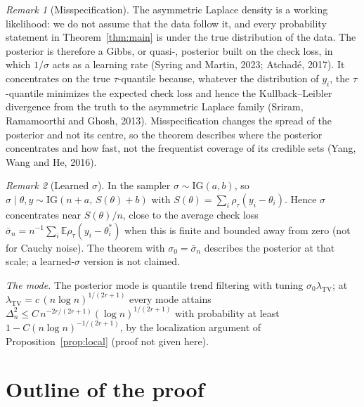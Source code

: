 \documentclass[11pt]{article}
\theoremstyle{definition}
\theoremstyle{remark}
\newtheorem{remark}{Remark}
\newcommand{\E}{\mathbb{E}}
\newcommand{\TV}{\mathrm{TV}}
\newcommand{\lamtv}{\lambda_{\TV}}
\newcommand{\thetas}{\theta^{*}}
\begin{document}
\begin{remark}[Misspecification]
The asymmetric Laplace density is a working likelihood: we do not assume that the data follow it, and every probability statement in Theorem~\ref{thm:main} is under the true distribution of the data. The posterior is therefore a Gibbs, or quasi-, posterior built on the check loss, in which $1/\sigma$ acts as a learning rate (Syring and Martin, 2023; Atchad\'e, 2017). It concentrates on the true $\tau$-quantile because, whatever the distribution of $y_i$, the $\tau$-quantile minimizes the expected check loss and hence the Kullback--Leibler divergence from the truth to the asymmetric Laplace family (Sriram, Ramamoorthi and Ghosh, 2013). Misspecification changes the spread of the posterior and not its centre, so the theorem describes where the posterior concentrates and how fast, not the frequentist coverage of its credible sets (Yang, Wang and He, 2016).
\end{remark}

\begin{remark}[Learned $\sigma$]
In the sampler $\sigma\sim\mathrm{IG}(a,b)$, so $\sigma\mid\theta,y\sim\mathrm{IG}(n+a,\,S(\theta)+b)$ with $S(\theta)=\sum_i\rho_\tau(y_i-\theta_i)$. Hence $\sigma$ concentrates near $S(\theta)/n$, close to the average check loss $\bar\sigma_n=n^{-1}\sum_i\E\rho_\tau(y_i-\thetas_i)$ when this is finite and bounded away from zero (not for Cauchy noise). The theorem with $\sigma_0=\bar\sigma_n$ describes the posterior at that scale; a learned-$\sigma$ version is not claimed.
\end{remark}

\noindent\emph{The mode.} The posterior mode is quantile trend filtering with tuning $\sigma_0\lamtv$; at $\lamtv=c\,(n\log n)^{1/(2r+1)}$ every mode attains $\Delta_n^2\le C\,n^{-2r/(2r+1)}(\log n)^{1/(2r+1)}$ with probability at least $1-C(n\log n)^{-1/(2r+1)}$, by the localization argument of Proposition~\ref{prop:local} (proof not given here).

\section{Outline of the proof}\label{sec:outline}
\end{document}
